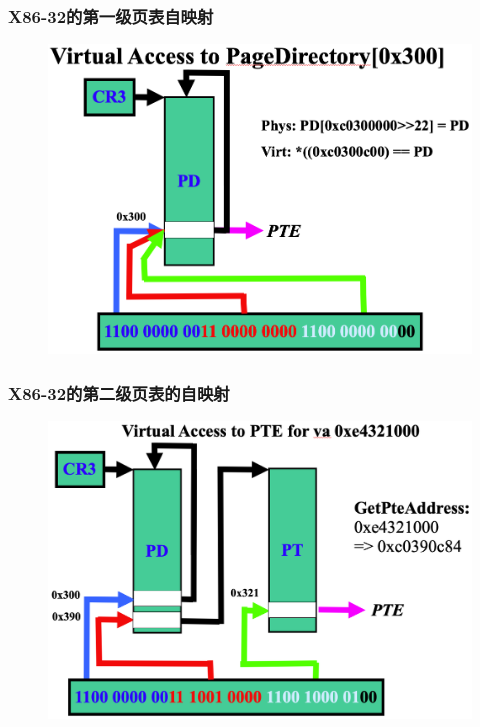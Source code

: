 % 
% 
\begin{frame}
    \frametitle{X86-32的第一级页表自映射}
    \begin{figure}
    \includegraphics[width=0.63\linewidth]{figs/1-level-self-mapping-pt.png}
    \end{figure}
\end{frame}
% 
\begin{frame}
    \frametitle{X86-32的第二级页表的自映射}
    \begin{figure}
    \includegraphics[width=0.63\linewidth]{figs/2-level-self-mapping-pt.png}
    \end{figure}
\end{frame}
